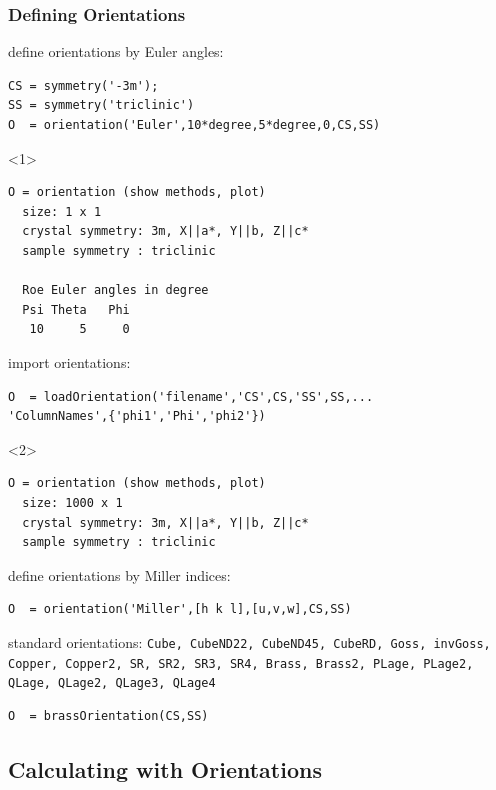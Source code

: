 \begin{frame}[fragile]
  \frametitle{Defining Orientations}

  define orientations by Euler angles:
  \begin{lstlisting}
CS = symmetry('-3m');
SS = symmetry('triclinic')
O  = orientation('Euler',10*degree,5*degree,0,CS,SS)
  \end{lstlisting}
  \begin{onlyenv}<1>
  \begin{lstlisting}[style=output]
O = orientation (show methods, plot)
  size: 1 x 1
  crystal symmetry: 3m, X||a*, Y||b, Z||c*
  sample symmetry : triclinic

  Roe Euler angles in degree
  Psi Theta   Phi
   10     5     0
  \end{lstlisting}
  \end{onlyenv}

  \pause
  import orientations:
  \begin{lstlisting}
O  = loadOrientation('filename','CS',CS,'SS',SS,...
'ColumnNames',{'phi1','Phi','phi2'})
  \end{lstlisting}
  \begin{onlyenv}<2>
  \begin{lstlisting}[style=output]
O = orientation (show methods, plot)
  size: 1000 x 1
  crystal symmetry: 3m, X||a*, Y||b, Z||c*
  sample symmetry : triclinic
  \end{lstlisting}
  \end{onlyenv}

\pause

define orientations by Miller indices:
   \begin{lstlisting}
O  = orientation('Miller',[h k l],[u,v,w],CS,SS)
  \end{lstlisting}

\pause

standard orientations: \texttt{Cube, CubeND22, CubeND45, CubeRD, Goss,
invGoss, Copper, Copper2, SR, SR2, SR3, SR4, Brass, Brass2, PLage, PLage2,
QLage, QLage2, QLage3, QLage4}

\begin{lstlisting}
O  = brassOrientation(CS,SS)
\end{lstlisting}

\end{frame}


\subsection*{Calculating with Orientations}
\label{sec:calc-with-orient}

